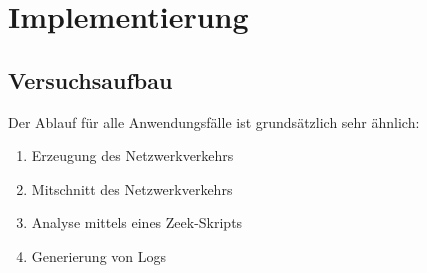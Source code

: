 \chapter{Implementierung}%
\label{cha:implementation}





\section{Versuchsaufbau}
Der Ablauf für alle Anwendungsfälle ist grundsätzlich sehr ähnlich:
\begin{enumerate}
\item{Erzeugung des Netzwerkverkehrs}
\item{Mitschnitt des Netzwerkverkehrs}
\item{Analyse mittels eines Zeek-Skripts}
\item{Generierung von Logs}
\end{enumerate}
